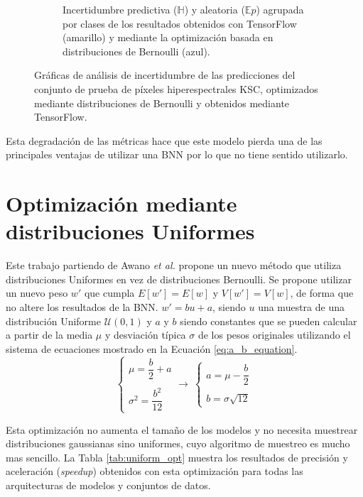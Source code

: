 \begin{figure}[h]
\begin{subfigure}[b]{0.51\textwidth}
         \caption{Incertidumbre predictiva ($\mathbb{H}$) y aleatoria ($\mathbb{E}p$) agrupada por clases de los resultados obtenidos con TensorFlow (amarillo) y mediante la optimización basada en distribuciones de Bernoulli (azul).}
         \label{fig:bernoulli_class}
     \end{subfigure}
     \caption{Gráficas de análisis de incertidumbre de las predicciones del conjunto de prueba de píxeles hiperespectrales KSC, optimizados mediante distribuciones de Bernoulli y obtenidos mediante TensorFlow.}
     \label{fig:bernoulli}
\end{figure}

Esta degradación de las métricas hace que este modelo pierda una de las principales ventajas de utilizar una BNN por lo que no tiene sentido utilizarlo.

\section{Optimización mediante distribuciones Uniformes}

Este trabajo partiendo de Awano \emph{et al.} propone un nuevo método que utiliza distribuciones Uniformes en vez de distribuciones Bernoulli. Se propone utilizar un nuevo peso $w'$ que cumpla $E[w'] = E[w]$ y $V[w'] = V[w]$, de forma que no altere los resultados de la BNN. $w' = bu + a$, siendo $u$ una muestra de una distribución Uniforme $\mathcal{U}(0,1)$ y $a$ y $b$ siendo constantes que se pueden calcular a partir de la media $\mu$ y desviación típica $\sigma$ de los pesos originales utilizando el sistema de ecuaciones mostrado en la Ecuación \ref{eq:a_b_equation}.
\begin{equation}\label{eq:a_b_equation}
\begin{cases}
\mu = \dfrac{b}{2} + a\\ \\
\sigma^2 = \dfrac{b^2}{12}
\end{cases}
\rightarrow\ 
\begin{cases}
a = \mu - \dfrac{b}{2}\\ \\
b = \sigma \sqrt{12}
\end{cases}
\end{equation}

Esta optimización no aumenta el tamaño de los modelos y no necesita muestrear distribuciones gaussianas sino uniformes, cuyo algoritmo de muestreo es mucho mas sencillo. La Tabla \ref{tab:uniform_opt} muestra los resultados de precisión y aceleración (\textit{speedup}) obtenidos con esta optimización para todas las arquitecturas de modelos y conjuntos de datos.

